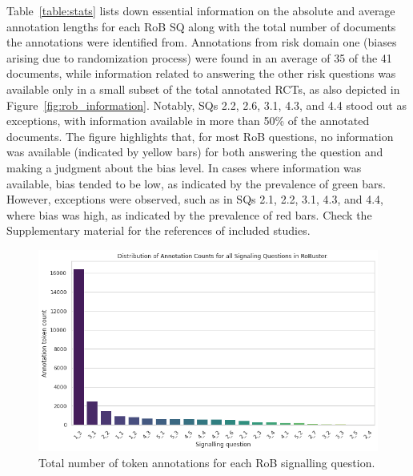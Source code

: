 \documentclass[sn-mathphys,Numbered]{sn-jnl}%
\theoremstyle{thmstyleone}%
\theoremstyle{thmstyletwo}%
\theoremstyle{thmstylethree}%
\begin{document}
Table~\ref{table:stats} lists down essential information on the absolute and average annotation lengths for each RoB SQ along with the total number of documents the annotations were identified from.
Annotations from risk domain one (biases arising due to randomization process) were found in an average of 35 of the 41 documents, while information related to answering the other risk questions was available only in a small subset of the total annotated RCTs, as also depicted in Figure~\ref{fig:rob_information}.
Notably, SQs 2.2, 2.6, 3.1, 4.3, and 4.4 stood out as exceptions, with information available in more than 50\% of the annotated documents.
The figure highlights that, for most RoB questions, no information was available (indicated by yellow bars) for both answering the question and making a judgment about the bias level. 
In cases where information was available, bias tended to be low, as indicated by the prevalence of green bars. 
However, exceptions were observed, such as in SQs 2.1, 2.2, 3.1, 4.3, and 4.4, where bias was high, as indicated by the prevalence of red bars.
Check the Supplementary material for the references of included studies.
%
%
%
\begin{figure}[htb]
    \centering
    \includegraphics[width=0.90\columnwidth]{figures/annot_counts.png}
    \caption{Total number of token annotations for each RoB signalling question.}
    \label{fig:ann_counts}
\end{figure}
%
%
%
\end{document}
